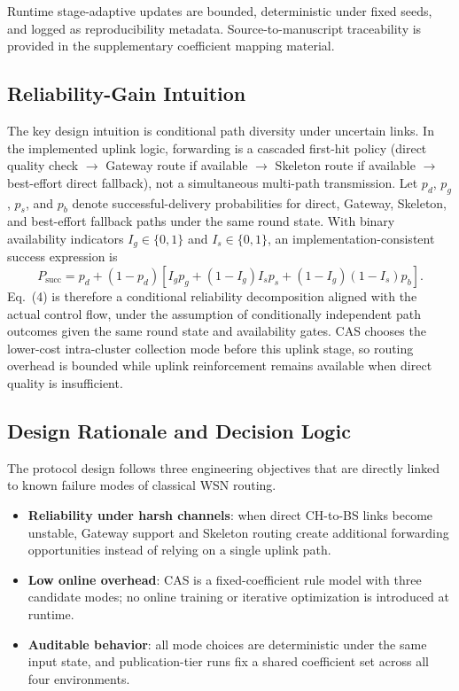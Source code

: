 ﻿\documentclass[sensors,article,submit,moreauthors,pdftex]{Definitions/mdpi}
\begin{document}
Runtime stage-adaptive updates are bounded, deterministic under fixed seeds, and logged as reproducibility metadata. Source-to-manuscript traceability is provided in the supplementary coefficient mapping material.

\subsection{Reliability-Gain Intuition}
The key design intuition is conditional path diversity under uncertain links. In the implemented uplink logic, forwarding is a cascaded first-hit policy (direct quality check \(\rightarrow\) Gateway route if available \(\rightarrow\) Skeleton route if available \(\rightarrow\) best-effort direct fallback), not a simultaneous multi-path transmission. Let \(p_d\), \(p_g\), \(p_s\), and \(p_b\) denote successful-delivery probabilities for direct, Gateway, Skeleton, and best-effort fallback paths under the same round state. With binary availability indicators \(I_g\in\{0,1\}\) and \(I_s\in\{0,1\}\), an implementation-consistent success expression is
\begin{equation}
P_{\mathrm{succ}} = p_d + (1-p_d)\left[I_g p_g + (1-I_g)I_s p_s + (1-I_g)(1-I_s)p_b\right].
\end{equation}
Eq.~(4) is therefore a conditional reliability decomposition aligned with the actual control flow, under the assumption of conditionally independent path outcomes given the same round state and availability gates. CAS chooses the lower-cost intra-cluster collection mode before this uplink stage, so routing overhead is bounded while uplink reinforcement remains available when direct quality is insufficient.

\subsection{Design Rationale and Decision Logic}
The protocol design follows three engineering objectives that are directly linked to known failure modes of classical WSN routing.
\begin{itemize}
\item \textbf{Reliability under harsh channels}: when direct CH-to-BS links become unstable, Gateway support and Skeleton routing create additional forwarding opportunities instead of relying on a single uplink path.
\item \textbf{Low online overhead}: CAS is a fixed-coefficient rule model with three candidate modes; no online training or iterative optimization is introduced at runtime.
\item \textbf{Auditable behavior}: all mode choices are deterministic under the same input state, and publication-tier runs fix a shared coefficient set across all four environments.
\end{itemize}
\end{document}
